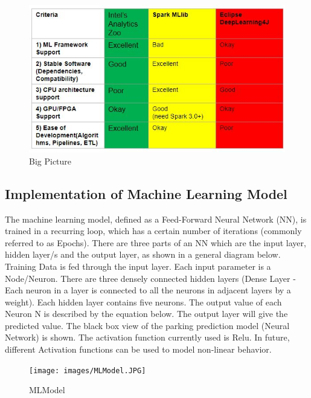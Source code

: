         \begin{figure}[H]
              
              \includegraphics[scale=0.8]{images/ComparisonTable.JPG}
              \caption{Big Picture}
              \label{fig:Big Picture}
                  
            \end{figure}

\subsection{Implementation of Machine Learning Model}
    The machine learning model, defined as a Feed-Forward Neural Network (NN), is trained in a recurring loop, which has a certain number of iterations (commonly referred to as Epochs). There are three parts of an NN which are the input layer, hidden layer/s and the output layer, as shown in a general diagram below. Training Data is fed through the input layer. Each input parameter is a Node/Neuron. There are three densely connected hidden layers (Dense Layer - Each neuron in a layer is connected to all the neurons in adjacent layers by a weight). Each hidden layer contains five neurons. The output value of each Neuron N is described by the equation below. The output layer will give the predicted value. The black box view of the parking prediction model (Neural Network) is shown. The activation function currently used is Relu. In future, different Activation functions can be used to model non-linear behavior.
    
        \begin{figure}[H]
              
              \texttt{[image: images/MLModel.JPG]}
              \caption{MLModel}
              \label{fig:MLModel}
                  
        \end{figure}


